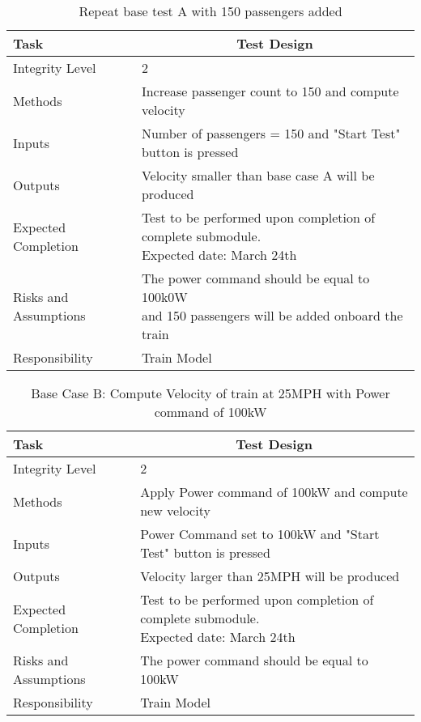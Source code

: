 \documentclass[]{article}
\begin{document}
   	\begin{table}[H]
	   	\centering
	   	\caption{Repeat base test A with 150 passengers added}
	   	\begin{tabular}{|l|l|}
	   		\hline
	   		Task & \multicolumn{1}{c|}{Test Design} \\ \hline
	   		Integrity Level & 2 \\ \hline
	   		Methods & Increase passenger count to 150 and compute velocity  \\ \hline
	   		Inputs &  Number of passengers = 150 and "Start Test" button is pressed \\ \hline
	   		Outputs &  Velocity smaller than base case A will be produced  \\ \hline
	   		Expected Completion & \parbox[t]{10cm}{Test to be performed upon completion of complete submodule.\\ Expected date: March 24th}\\ \hline
	   		Risks and Assumptions & \parbox[t]{10cm}{The power command should be equal to 100k0W \\and 150 passengers will be added onboard the train} \\ \hline
	   		Responsibility & Train Model\\ \hline
	   	\end{tabular}
   \end{table}

	\begin{table}[H]
		\centering
		\caption{Base Case B: Compute Velocity of train at 25MPH with Power command of 100kW }
		\begin{tabular}{|l|l|}
			\hline
			Task & \multicolumn{1}{c|}{Test Design} \\ \hline
			Integrity Level & 2 \\ \hline
			Methods & Apply Power command of 100kW and compute new velocity  \\ \hline
			Inputs &  Power Command set to 100kW and "Start Test" button is pressed \\ \hline
			Outputs &  Velocity larger than 25MPH will be produced  \\ \hline
			Expected Completion & \parbox[t]{10cm}{Test to be performed upon completion of complete submodule.\\ Expected date: March 24th}\\ \hline
			Risks and Assumptions & The power command should be equal to 100kW \\ \hline
			Responsibility & Train Model\\ \hline
		\end{tabular}
	\end{table}
\end{document}
